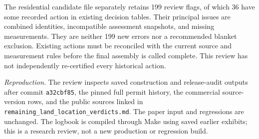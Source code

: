The residential candidate file separately retains 199 review flags, of which
36 have some recorded action in existing decision tables. Their principal
issues are combined identities, incompatible assessment snapshots, and missing
measurements. They are neither 199 new errors nor a recommended blanket
exclusion. Existing actions must be reconciled with the current source and
measurement rules before the final assembly is called complete. This review
has not independently re-certified every historical action.

\textit{Reproduction.} The review inspects saved construction and release-audit
outputs after commit \texttt{a32cbf85}, the pinned full permit history, the
commercial source-version rows, and the public sources linked in
\texttt{remaining\_land\_location\_verdicts.md}. The paper input and regressions
are unchanged. The logbook is compiled through Make using saved earlier exhibits;
this is a research review, not a new production or regression build.
